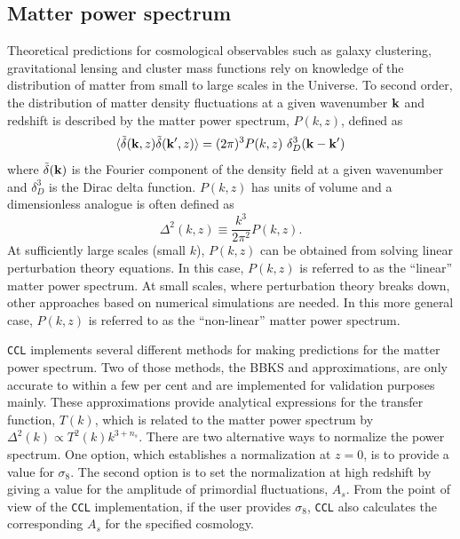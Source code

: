 \documentclass[\docopts]{\docclass}
\newcommand{\ccl}{{\tt CCL}\xspace}
\begin{document}
\subsection{Matter power spectrum}
\label{sec:matterps}

Theoretical predictions for cosmological observables such as galaxy clustering, gravitational lensing and cluster mass functions rely on knowledge of the distribution of matter from small to large scales in the Universe. To second order, the distribution of matter density fluctuations at a given wavenumber ${\bf k}$ and redshift is described by the matter power spectrum, $P(k,z)$, defined as
\begin{equation}
  \langle \tilde\delta({\bf k},z)\tilde\delta({\bf k}^\prime,z)\rangle = (2\pi)^3P(k,z)\
\delta_D^3({\bf k}-{\bf k}')
\end{equation}
where $\tilde\delta({\bf k})$ is the Fourier component of the density field at a given wavenumber and $\delta_D^3$ is the Dirac delta function. $P(k,z)$ has units of volume and a dimensionless analogue is often defined as
\begin{equation}
  \Delta^2(k,z) \equiv \frac{k^3}{2\pi^2}P(k,z).
\end{equation}
At sufficiently large scales (small $k$), $P(k,z)$ can be obtained from solving linear perturbation theory equations. In this case, $P(k,z)$ is referred to as the ``linear'' matter power spectrum. At small scales, where perturbation theory breaks down, other approaches based on numerical simulations are needed. In this more general case, $P(k,z)$ is referred to as the ``non-linear'' matter power spectrum.

\ccl implements several different methods for making predictions for the matter power spectrum. Two of those methods, the BBKS \citep{BBKS} and \citet{1998ApJ...496..605E} approximations, are only accurate to within a few per cent and are implemented for validation purposes mainly. These approximations provide analytical expressions for the transfer function, $T(k)$, which is related to the matter power spectrum by $\Delta^2(k) \propto T^2(k) k^{3+n_s}$. There are two alternative ways to normalize the power spectrum. One option, which establishes a normalization at $z=0$, is to provide a value for $\sigma_8$. The second option is to set the normalization at high redshift by giving a value for the amplitude of primordial fluctuations, $A_s$. From the point of view of the \ccl implementation, if the user provides $\sigma_8$, \ccl also calculates the corresponding $A_s$ for the specified cosmology.
\end{document}
